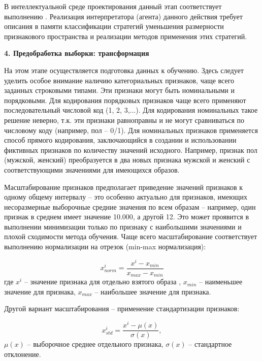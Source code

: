 В интеллектуальной среде проектирования данный этап соответствует выполнению . Реализация интерпретатора (агента) данного действия требует описания в памяти классификации стратегий уменьшения размерности признакового пространства и реализации методов применения этих стратегий.


\textbf{4. Предобработка выборки: трансформация}

На этом этапе осуществляется подготовка данных к обучению.
Здесь следует уделить особое внимание наличию категориальных признаков, чаще всего заданных строковыми типами. Эти признаки могут быть номинальными и порядковыми. Для кодирования порядковых признаков чаще всего применяют последовательный числовой код (1, 2, 3,...). Для кодирования номинальных такое решение неверно, т.к. эти признаки равноправны и не могут сравниваться по числовому коду (например, пол -- 0/1). Для номинальных признаков применяется способ прямого кодирования, заключающийся в создании и использовании фиктивных признаков по количеству значений исходного. Например, признак пол (мужской, женский) преобразуется в два новых признака мужской и женский с соответствующими значениями для имеющихся образов.

Масштабирование признаков предполагает приведение значений признаков к одному общему интервалу -- это особенно актуально для признаков, имеющих несоразмерные выборочные средние значения по всем образам -- например, один признак в среднем имеет значение 10.000, а другой 12. Это может проявится в выполнении минимизации только по признаку с наибольшими значениями и плохой сходимости метода обучения. Чаще всего масштабирование соответствует выполнению нормализации на отрезок (min-max нормализация):

\begin{equation*}
	x_{norm}^i = \frac{x^i - x_{min}}{x_{max} - x_{min}}
\end{equation*}
где $x^i$ -- значение признака для отдельно взятого образа , $x_{min}$ -- наименьшее значение для признака, $x_{max}$ -- наибольшее значение для признака.

Другой вариант масштабирования -- применение стандартизации признаков:

\begin{equation*}
	x_{std}^i = \frac{x^i - \mu(x)}{\sigma(x)},
\end{equation*}
$\mu(x)$ -- выборочное среднее отдельного признака, $\sigma(x)$ -- стандартное отклонение.

